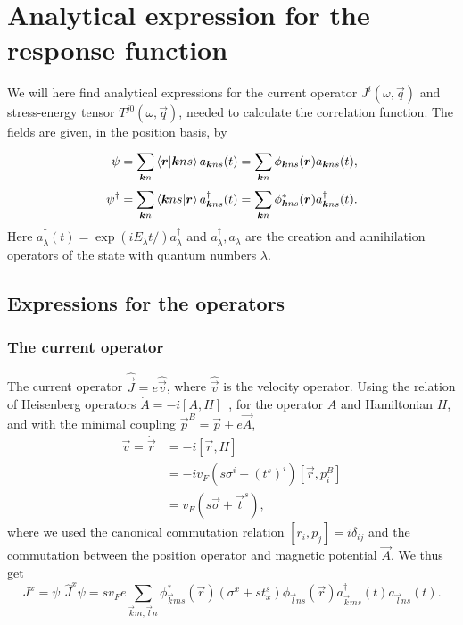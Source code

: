 \section{Analytical expression for the response function}
We will here find analytical expressions for the current operator $J^i(\omega, \vec{q})$ and stress-energy tensor $T^{j 0}(\omega, \vec{q})$, needed to calculate the correlation function.
The fields are given, in the position basis, by
\begin{align}
  \psi &= \sum\limits_{\bm{k}n}^{}\braket{\bm{r} | \bm{k} n s} a_{\bm{k}ns}(t) = \sum\limits_{\bm{k}n}^{} \phi_{\bm{k} n s} (\bm{r}) a_{\bm{k}n s}(t),\\
  \psi^{\dagger} &= \sum\limits_{\bm{k}n}^{}
                   \braket{\bm{k} ns | \bm{r} }
                   a^{\dagger}_{\bm{k}ns}(t)
                   =\sum\limits_{\bm{k}n}^{} \phi^{*}_{\bm{k} n s} (\bm{r}) a^{\dagger}_{\bm{k}n s}(t).
\end{align}
Here $a_{\lambda }^{\dagger} (t) = \exp(iE_{\lambda } t / ) a_{\lambda }^{\dagger}$ and $a_{\lambda }^{\dagger}, a_{\lambda }$ are the creation and annihilation operators of the state with quantum numbers $\lambda $.
\subsection{Expressions for the operators}
\subsubsection{The current operator}
The current operator $\hat{\vec{J}} = e \hat{\vec{v}}$, where $\hat{\vec{v}}$ is the velocity operator.
Using the relation of Heisenberg operators $\dot{A} = -i [A, H] $~\cite{sakuraiModernQuantumMechanics2017}, for the operator $A$ and Hamiltonian $H$, and with the minimal coupling \( \vec{p}^B = \vec{p} + e \vec{A} \),
\begin{align}
  \vec{v} = \dot{\vec{r}} &= -i \left[ \vec{r}, H \right]\\
  &= -i v_F (s \sigma^i + (t^s)^i) \left[\vec{r}, p^B_i\right]\\
  &= v_F (s \vec{\sigma} + \vec{t}^s),
\end{align}
where we used the canonical commutation relation \( [r_i, p_j] = i \delta_{ij} \) and the commutation between the position operator and magnetic potential \( \vec{A} \).
We thus get
\begin{equation}
  J^x = \psi ^{\dagger} \hat{J}^x \psi = sv_F e \sum\limits_{\vec{k}m, \vec{l}n}^{}
  \phi _{\vec{k}ms}^{*}(\vec{r}) \left(\sigma^x + s t^s_x\right) \phi _{\vec{l}ns}(\vec{r})
  a_{\vec{k}ms}^{\dagger}(t)
  a_{\vec{l}ns}(t).
\end{equation}

